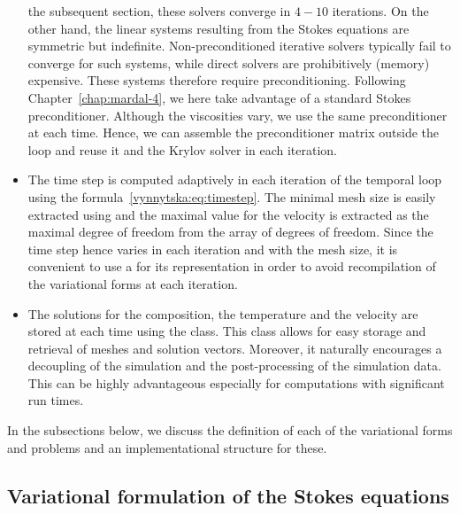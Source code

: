 \begin{itemize}
  the subsequent section, these solvers converge in $4 - 10$
  iterations.  On the other hand, the linear systems resulting from
  the Stokes equations are symmetric but
  indefinite. Non-preconditioned iterative solvers typically fail to
  converge for such systems, while direct solvers are prohibitively
  (memory) expensive. These systems therefore require
  preconditioning. Following Chapter~\ref{chap:mardal-4}, we here take
  advantage of a standard Stokes preconditioner. Although the
  viscosities vary, we use the same preconditioner at each
  time. Hence, we can assemble the preconditioner matrix outside the
  loop and reuse it and the Krylov solver in each iteration.
\item
  The time step  is computed adaptively in each iteration of
  the temporal loop using the
  formula~\eqref{vynnytska:eq:timestep}. The minimal mesh size is
  easily extracted using  and the maximal value for
  the velocity is extracted as the maximal degree of freedom from
  the  array of degrees of freedom. Since the time step
  hence varies in each iteration and with the mesh size, it is
  convenient to use a  for its representation in order
  to avoid recompilation of the variational forms at each iteration.
\item
  The solutions for the composition, the temperature and the velocity
  are stored at each time using the  class. This
  class allows for easy storage and retrieval of meshes and solution
  vectors. Moreover, it naturally encourages a decoupling of the
  simulation and the post-processing of the simulation data. This can
  be highly advantageous especially for computations with significant
  run times.
\end{itemize}
In the subsections below, we discuss the definition of each of the
variational forms and problems and an implementational structure for
these.

\subsection{Variational formulation of the Stokes equations}

